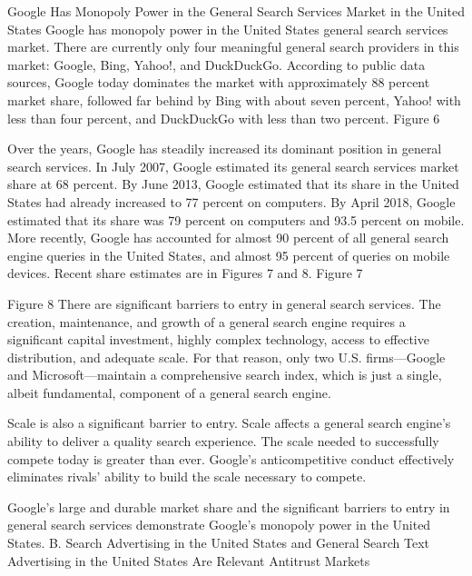 \documentclass[11pt,b5paper]{scrartcl}
\begin{document}

Google Has Monopoly Power in the General Search Services Market in
the United States
Google has monopoly power in the United States general search services market.
There are currently only four meaningful general search providers in this market: Google, Bing,
Yahoo!, and DuckDuckGo. According to public data sources, Google today dominates the
market with approximately 88 percent market share, followed far behind by Bing with about
seven percent, Yahoo! with less than four percent, and DuckDuckGo with less than two percent.
Figure 6


Over the years, Google has steadily increased its dominant position in general
search services. In July 2007, Google estimated its general search services market share at
68 percent. By June 2013, Google estimated that its share in the United States had already
increased to 77 percent on computers. By April 2018, Google estimated that its share was
79 percent on computers and 93.5 percent on mobile. More recently, Google has accounted for
almost 90 percent of all general search engine queries in the United States, and almost 95 percent
of queries on mobile devices. Recent share estimates are in Figures 7 and 8.
Figure 7


Figure 8
There are significant barriers to entry in general search services. The creation,
maintenance, and growth of a general search engine requires a significant capital investment,
highly complex technology, access to effective distribution, and adequate scale. For that reason,
only two U.S. firms—Google and Microsoft—maintain a comprehensive search index, which is
just a single, albeit fundamental, component of a general search engine.


Scale is also a significant barrier to entry. Scale affects a general search engine’s
ability to deliver a quality search experience. The scale needed to successfully compete today is
greater than ever. Google’s anticompetitive conduct effectively eliminates rivals’ ability to build
the scale necessary to compete.


Google’s large and durable market share and the significant barriers to entry in
general search services demonstrate Google’s monopoly power in the United States.
B.
Search Advertising in the United States and General Search Text Advertising in
the United States Are Relevant Antitrust Markets
\end{document}

